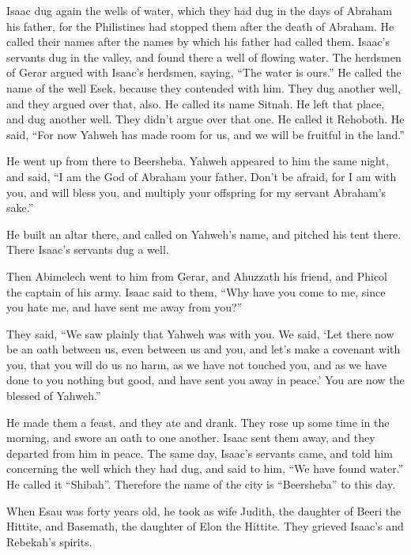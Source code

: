 {\par }{\PP {}Isaac dug again the wells of water, which they had dug in the days of Abraham his father, for the Philistines had stopped them after the death of Abraham. He called their names after the names by which his father had called them.
Isaac’s servants dug in the valley, and found there a well of flowing water.
The herdsmen of Gerar argued with Isaac’s herdsmen, saying, “The water is ours.” He called the name of the well Esek, because they contended with him.
They dug another well, and they argued over that, also. He called its name Sitnah.
He left that place, and dug another well. They didn’t argue over that one. He called it Rehoboth. He said, “For now Yahweh has made room for us, and we will be fruitful in the land.”
\par }{\PP {}He went up from there to Beersheba.
Yahweh appeared to him the same night, and said, “I am the God of Abraham your father. Don’t be afraid, for I am with you, and will bless you, and multiply your offspring for my servant Abraham’s sake.”
\par }{\PP {}He built an altar there, and called on Yahweh’s name, and pitched his tent there. There Isaac’s servants dug a well.
\par }{\PP {}Then Abimelech went to him from Gerar, and Ahuzzath his friend, and Phicol the captain of his army.
Isaac said to them, “Why have you come to me, since you hate me, and have sent me away from you?”
\par }{\PP {}They said, “We saw plainly that Yahweh was with you. We said, ‘Let there now be an oath between us, even between us and you, and let’s make a covenant with you,
that you will do us no harm, as we have not touched you, and as we have done to you nothing but good, and have sent you away in peace.’ You are now the blessed of Yahweh.”
\par }{\PP {}He made them a feast, and they ate and drank.
They rose up some time in the morning, and swore an oath to one another. Isaac sent them away, and they departed from him in peace.
The same day, Isaac’s servants came, and told him concerning the well which they had dug, and said to him, “We have found water.”
He called it “Shibah”. Therefore the name of the city is “Beersheba” to this day.
\par }{\PP {}When Esau was forty years old, he took as wife Judith, the daughter of Beeri the Hittite, and Basemath, the daughter of Elon the Hittite.
They grieved Isaac’s and Rebekah’s spirits.

}
